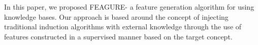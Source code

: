 \documentclass[twoside,11pt]{article}
\theoremstyle{definition}
\begin{document}
In this paper, we proposed FEAGURE- a feature generation algorithm for using knowledge bases. Our approach is based around the concept of injecting traditional induction algorithms with external knowledge through the use of features constructed in a supervised manner based on the target concept. 






\end{document}
